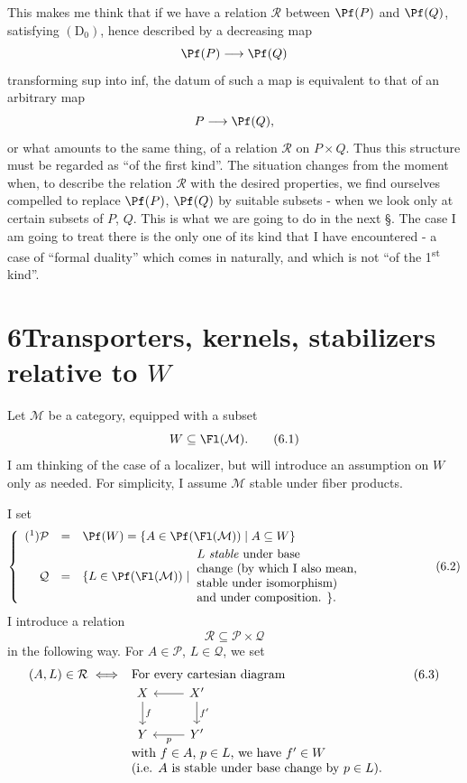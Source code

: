 This makes me think that if we have a relation $\mathcal{R}$ between $\Pf(P)$ and $\Pf(Q)$, satisfying $(\mathrm{D}_0)$, hence described by a decreasing map
\[
\Pf(P)\longrightarrow\Pf(Q)
\]
transforming sup into inf, the datum of such a map is equivalent to that of an arbitrary map %
\[
P\longrightarrow\Pf(Q),
\]
or what amounts to the same thing, of a relation $\mathcal{R}$ on $P\times Q$. Thus this structure must be regarded as ``of the first kind''. The situation changes from the moment when, to describe the relation $\mathcal{R}$ with the desired properties, we find ourselves compelled to replace $\Pf(P)$, $\Pf(Q)$ by suitable subsets - when we look only at certain subsets of $P$, $Q$. This is what we
are going to do in the next §. The case I am going to treat there is the only one of its kind that I have encountered - a case of ``formal duality'' which comes in naturally, and which is not ``of the 1\textsuperscript{st} kind''.

\section*{6\quad Transporters, kernels, stabilizers relative to $W$}

Let $\mathcal{M}$ be a category, equipped with a subset
\[
W\subseteq\Fl(\mathcal{M}).
\tag*{(6.1)}
\]
I am thinking of the case of a localizer, but will introduce an assumption on $W$ only as needed. For simplicity, I assume $\mathcal{M}$ stable under fiber products.

I set
\[
\left\{
\begin{array}{rcl}
\mbox{(\footnotemark)}\mathcal{P} & = & \Pf(W)=\{A\in\Pf(\Fl(\mathcal{M}))\mid A\subseteq W\}\\[1ex]
\mathcal{Q} & = & \{L\in\Pf(\Fl(\mathcal{M}))\mid\
\parbox[c]{17em}{$L$ \textit{stable} under base\\
change (by which I also mean,\\
stable under isomorphism)\\
and under composition. $\}$.}
\end{array}
\right.
\tag*{(6.2)}
\]
I introduce a relation
\[
\mathcal{R}\subseteq\mathcal{P}\times\mathcal{Q}
\]
in the following way. For $A\in\mathcal{P}$, $L\in\mathcal{Q}$, we set
\[
(A,L)\in\mathcal{R}\iff
\begin{array}[t]{l}
\text{For every cartesian diagram}\\
\begin{tikzcd}[ampersand replacement=\&]
X \arrow[d, "f"] \& X' \arrow[l] \arrow[d, "f'"] \\
Y \& Y' \arrow[l, "p"]
\end{tikzcd}\\
\text{with $f\in A$, $p\in L$, we have $f'\in W$}\\
\text{(i.e. $A$ is stable under base change by $p\in L$).}
\end{array}
\tag*{(6.3)}
\]

